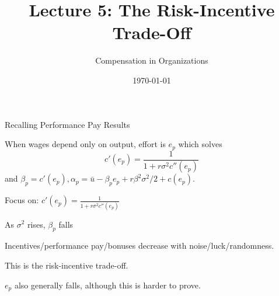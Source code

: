 \documentclass[aspectratio=169,usenames,dvipsnames]{beamer}
\title[diss]{Lecture 5: The Risk-Incentive Trade-Off} %
\author{Compensation in Organizations} %
\institute[shortinst]{Jacob Kohlhepp}
\date{\today} %
\newenvironment{wideitemize}{\itemize\addtolength{\itemsep}{10pt}}{\enditemize}
\begin{document}
\begin{frame}
\titlepage %

\end{frame}


\begin{frame}{Recalling Performance Pay Results}

\begin{theorem}
        When wages depend only on output, effort is $e_{p}$ which solves 
        \[c'(e_{p})= \frac{1}{1+r \sigma^2 c''(e_{p})}\]
        and $\beta_{p} =c'(e_{p}),\alpha_{p} =\bar u - \beta_{p} e_{p}+r \beta^2\sigma^2/2+c(e_{p})$.
    \end{theorem}
    \begin{wideitemize}
        \item Focus on: $c'(e_{p})= \frac{1}{1+r \sigma^2 c''(e_{p})}$
        \item As $\sigma^2$ rises, $\beta_p$ falls
        \item Incentives/performance pay/bonuses decrease with noise/luck/randomness.
        \item This is the risk-incentive trade-off.
        \item $e_p$ also generally falls, although this is harder to prove.
    \end{wideitemize}
    
\end{frame}




\end{document}
